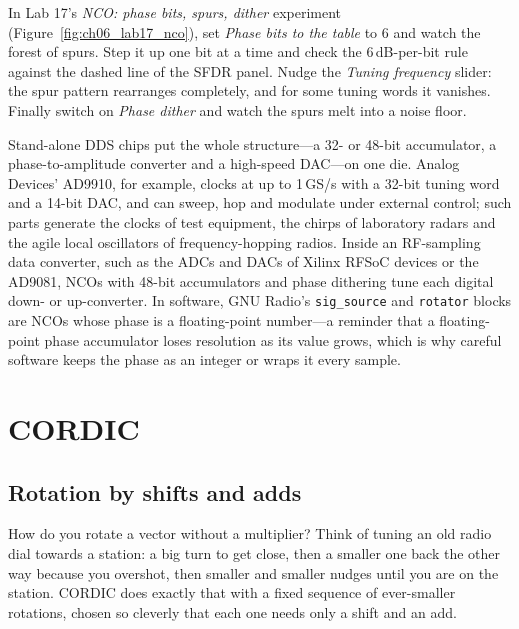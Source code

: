 \begin{tryit}
In Lab 17's \emph{NCO: phase bits, spurs, dither} experiment (Figure~\ref{fig:ch06_lab17_nco}), set \emph{Phase bits to the table}
to 6 and watch the forest of spurs. Step it up one bit at a time and check the 6\,dB-per-bit rule
against the dashed line of the SFDR panel. Nudge the \emph{Tuning frequency} slider: the spur pattern
rearranges completely, and for some tuning words it vanishes. Finally switch on \emph{Phase dither}
and watch the spurs melt into a noise floor.
\end{tryit}

\begin{inpractice}
Stand-alone DDS chips put the whole structure---a 32- or 48-bit accumulator, a phase-to-amplitude
converter and a high-speed DAC---on one die. Analog Devices' AD9910, for example, clocks at up to
1\,GS/s with a 32-bit tuning word and a 14-bit DAC, and can sweep, hop and modulate under external
control; such parts generate the clocks of test equipment, the chirps of laboratory radars and
the agile local oscillators of frequency-hopping radios. Inside an RF-sampling data converter, such as
the ADCs and DACs of Xilinx RFSoC devices or the AD9081, NCOs with 48-bit accumulators and phase
dithering tune each digital down- or up-converter. In software, GNU Radio's \texttt{sig\_source}
and \texttt{rotator} blocks are NCOs whose phase is a floating-point number---a reminder that a
floating-point phase accumulator loses resolution as its value grows, which is why careful software
keeps the phase as an integer or wraps it every sample.
\end{inpractice}

\section{CORDIC}
\label{sec:ch06:cordic}

\subsection{Rotation by shifts and adds}

How do you rotate a vector without a multiplier? Think of tuning an old radio dial towards a
station: a big turn to get close, then a smaller one back the other way because you overshot, then
smaller and smaller nudges until you are on the station. CORDIC does exactly that with a fixed
sequence of ever-smaller rotations, chosen so cleverly that each one needs only a shift and an add.

